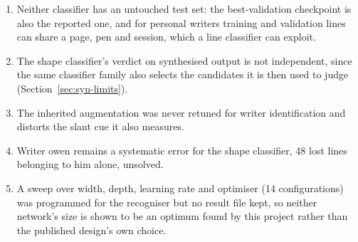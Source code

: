 \begin{enumerate}\setlength{\itemsep}{0pt}\setlength{\parskip}{0pt}
\item Neither classifier has an untouched test set: the best-validation checkpoint is also the reported one, and for personal writers training and validation lines can share a page, pen and session, which a line classifier can exploit.
\item The shape classifier's verdict on synthesised output is not independent, since the same classifier family also selects the candidates it is then used to judge (Section~\ref{sec:syn-limits}).
\item The inherited augmentation was never retuned for writer identification and distorts the slant cue it also measures.
\item Writer owen remains a systematic error for the shape classifier, 48 lost lines belonging to him alone, unsolved.
\item A sweep over width, depth, learning rate and optimiser (14 configurations) was programmed for the recogniser but no result file kept, so neither network's size is shown to be an optimum found by this project rather than the published design's own choice.
\end{enumerate}

